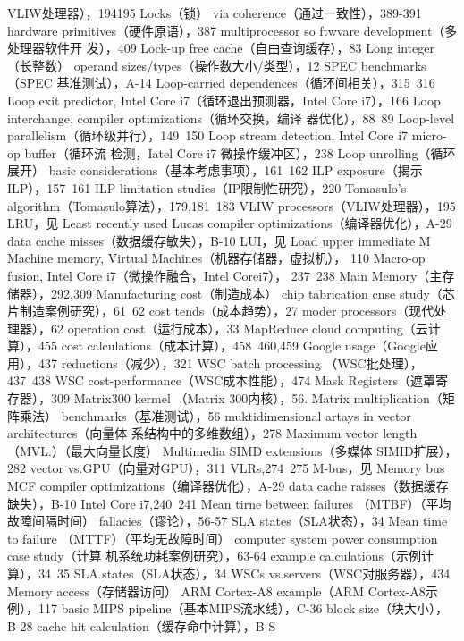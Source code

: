 VLIW处理器），194195
Locks（锁）
via coherence（通过一致性），389-391
hardware primitives（硬件原语），387
multiprocessor so ftwvare development（多处理器软件开
发），409
Lock-up free cache（自由查询缓存），83
Long integer（长整数）
operand sizes/types（操作数大小/类型），12
SPEC benchmarks（SPEC 基准测试），A-14
Loop-carried dependences（循环间相关），315~316
Loop exit predictor, Intel Core i7（循环退出预测器，Intel
Core i7），166
Loop interchange, compiler optimizations（循环交换，编译
器优化），88~89
Loop-level parallelism（循环级并行），149~150
Loop stream detection, Intel Core i7 micro-op buffer（循环流
检测，Iatel Core i7 微操作缓冲区），238
Loop unrolling（循环展开）
basic considerations（基本考虑事项），161~162
ILP exposure（揭示 ILP），157~161
ILP limitation studies（IP限制性研究），220
Tomasulo's algorithm（Tomasulo算法），179,181~183
VLIW processors（VLIW处理器），195
LRU，见 Least recently used
Lucas
compiler optimizations（编译器优化），A-29
data cache misses（数据缓存敏失），B-10
LUI，见 Load upper immediate
M
Machine memory, Virtual Machines（机器存储器，虚拟机），
110
Macro-op fusion, Intel Core i7（微操作融合，Intel Corei7），
237~238
Main Memory（主存储器），292,309
Manufacturing cost（制造成本）
chip tabrication cnse study（芯片制造案例研究），61~62
cost tends（成本趋势），27
moder processors（现代处理器），62
operation cost（运行成本），33
MapReduce
cloud computing（云计算），455
cost calculations（成本计算），458~460,459
Google usage（Google应用），437
reductions（减少），321
WSC batch processing （WSC批处理），437~438
WSC cost-performance（WSC成本性能），474
Mask Registers（遮罩寄存器），309
Matrix300 kermel （Matrix 300内核），56.
Matrix multiplication（矩阵乘法）
benchmarks（基准测试），56
muktidimensional artays in vector architectures（向量体
系结构中的多维数组），278
Maximum vector length（MVL.）（最大向量长度）
Multimedia SIMD extensions（多媒体 SIMID扩展），282
vector vs.GPU（向量对GPU），311
VLRs,274~275
M-bus，见 Memory bus
MCF
compiler optimizations（编译器优化），A-29
data cache raisses（数据缓存缺失），B-10
Intel Core i7,240~241
Mean tirne between failures （MTBF）（平均故障间隔时间）
fallacies（谬论），56-57
SLA states（SLA状态），34
Mean time to failure （MTTF）（平均无故障时间）
computer system power consumption case study（计算
机系统功耗案例研究），63-64
example calculations（示例计算），34~35
SLA states（SLA状态），34
WSCs vs.servers（WSC对服务器），434
Memory access（存储器访问）
ARM Cortex-A8 example（ARM Cortex-A8示例），117
basic MIPS pipeline（基本MIPS流水线），C-36
block size（块大小），B-28
cache hit calculation（缓存命中计算），B-S
